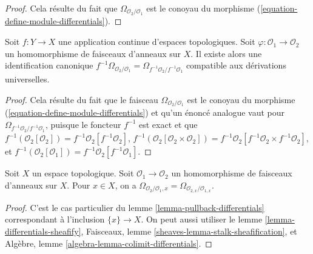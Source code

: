 \begin{proof}
Cela résulte du fait que $\Omega_{\mathcal{O}_2/\mathcal{O}_1}$ est le
conoyau du morphisme (\ref{equation-define-module-differentials}).
\end{proof}

\begin{lemma}
\label{lemma-pullback-differentials}
Soit $f : Y \to X$ une application continue d'espaces topologiques.
Soit $\varphi : \mathcal{O}_1 \to \mathcal{O}_2$ un homomorphisme de
faisceaux d'anneaux sur $X$. Il existe alors une identification canonique
$f^{-1}\Omega_{\mathcal{O}_2/\mathcal{O}_1} =
\Omega_{f^{-1}\mathcal{O}_2/f^{-1}\mathcal{O}_1}$
compatible aux dérivations universelles.
\end{lemma}

\begin{proof}
Cela résulte du fait que le faisceau
$\Omega_{\mathcal{O}_2/\mathcal{O}_1}$ est le conoyau du morphisme
(\ref{equation-define-module-differentials}) et qu'un énoncé analogue vaut
pour $\Omega_{f^{-1}\mathcal{O}_2/f^{-1}\mathcal{O}_1}$, puisque le foncteur
$f^{-1}$ est exact et que
$f^{-1}(\mathcal{O}_2[\mathcal{O}_2]) =
f^{-1}\mathcal{O}_2[f^{-1}\mathcal{O}_2]$,
$f^{-1}(\mathcal{O}_2[\mathcal{O}_2 \times \mathcal{O}_2]) =
f^{-1}\mathcal{O}_2[f^{-1}\mathcal{O}_2 \times f^{-1}\mathcal{O}_2]$, et
$f^{-1}(\mathcal{O}_2[\mathcal{O}_1]) =
f^{-1}\mathcal{O}_2[f^{-1}\mathcal{O}_1]$.
\end{proof}

\begin{lemma}
\label{lemma-stalk-module-differentials}
Soit $X$ un espace topologique. Soit
$\mathcal{O}_1 \to \mathcal{O}_2$ un homomorphisme de faisceaux d'anneaux
sur $X$. Pour $x \in X$, on a
$\Omega_{\mathcal{O}_2/\mathcal{O}_1, x} =
\Omega_{\mathcal{O}_{2, x}/\mathcal{O}_{1, x}}$.
\end{lemma}

\begin{proof}
C'est le cas particulier du lemme \ref{lemma-pullback-differentials}
correspondant à l'inclusion $\{x\} \to X$. On peut aussi utiliser le lemme
\ref{lemma-differentials-sheafify}, Faisceaux, lemme
\ref{sheaves-lemma-stalk-sheafification}, et Algèbre, lemme
\ref{algebra-lemma-colimit-differentials}.
\end{proof}

